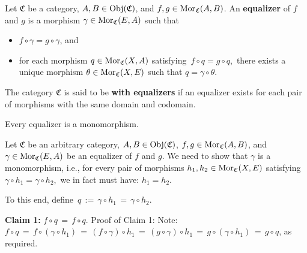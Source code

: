 \vskip 0.5cm
\begin{definition}[Equalizer]
\mbox{}
\vskip 0.1cm
\noindent
Let $\mathfrak{C}$ be a category, $A, B \in \textnormal{Obj}(\mathfrak{C})$, and $f, g \in \textnormal{Mor}_{\mathfrak{C}}(A,B)$.
\vskip 0.1cm
\noindent
An \textbf{equalizer} of $f$ and $g$ is a morphism $\gamma \in \textnormal{Mor}_{\mathfrak{C}}(E,A)$ such that
\begin{itemize}
\item
	$f \circ \gamma = g \circ \gamma$, and
\item
	for each morphism $q \in \textnormal{Mor}_{\mathfrak{C}}(X,A)$ satisfying \,$f \circ q = g \circ q$,\,
	there exists a unique morphism $\theta \in \textnormal{Mor}_{\mathfrak{C}}(X,E)$ such that
	$q = \gamma \circ \theta$.
	\begin{center}
	\end{center}
\end{itemize}
The category $\mathfrak{C}$ is said to be \textbf{with equalizers}
if an equalizer exists for each pair of morphisms with the same domain and codomain.
\end{definition}


\vskip 0.5cm
\begin{lemma}\label{EqualizersAreMonomorphisms}
\mbox{}
\vskip 0.1cm
\noindent
Every equalizer is a monomorphism.
\end{lemma}
\proof
Let $\mathfrak{C}$ be an arbitrary category, $A, B \in \textnormal{Obj}(\mathfrak{C})$, $f, g \in \textnormal{Mor}_{\mathfrak{C}}(A,B)$, and
$\gamma \in \textnormal{Mor}_{\mathfrak{C}}(E,A)$ be an equalizer of $f$ and $g$.
We need to show that $\gamma$ is a monomorphism, i.e.,
for every pair of morphisms $h_{1}, h_{2} \in \textnormal{Mor}_{\mathfrak{C}}(X,E)$
satisfying \,$\gamma \circ h_{1} = \gamma \circ h_{2}$,\,
we in fact must have: $h_{1} = h_{2}$.

\vskip 0.3cm
\noindent
To this end, define \,$q \,:=\, \gamma \circ h_{1} \,=\, \gamma \circ h_{2}$.\,

\vskip 0.3cm
\noindent
\textbf{Claim 1:}\; $f \circ q \,=\, f \circ q$.
\vskip 0.1cm
\noindent
Proof of Claim 1:\;
Note: $f \circ q \,=\, f \circ (\gamma \circ h_{1}) \,=\, (f \circ \gamma) \circ h_{1} \,=\, (g \circ \gamma) \circ h_{1} \,=\, g \circ (\gamma \circ h_{1}) \,=\, g \circ q$, as required.

